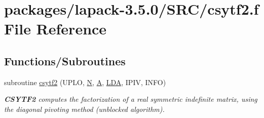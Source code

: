 \hypertarget{csytf2_8f}{}\section{packages/lapack-\/3.5.0/\+S\+R\+C/csytf2.f File Reference}
\label{csytf2_8f}
\subsection*{Functions/\+Subroutines}
\begin{DoxyCompactItemize}
\item 
subroutine \hyperlink{group__complexSYcomputational_ga0f12a3d0375451dcb483147e125665a1}{csytf2} (U\+P\+L\+O, \hyperlink{polmisc_8c_a0240ac851181b84ac374872dc5434ee4}{N}, \hyperlink{classA}{A}, \hyperlink{example__user_8c_ae946da542ce0db94dced19b2ecefd1aa}{L\+D\+A}, I\+P\+I\+V, I\+N\+F\+O)
\begin{DoxyCompactList}\small\item\em {\bfseries C\+S\+Y\+T\+F2} computes the factorization of a real symmetric indefinite matrix, using the diagonal pivoting method (unblocked algorithm). \end{DoxyCompactList}\end{DoxyCompactItemize}
